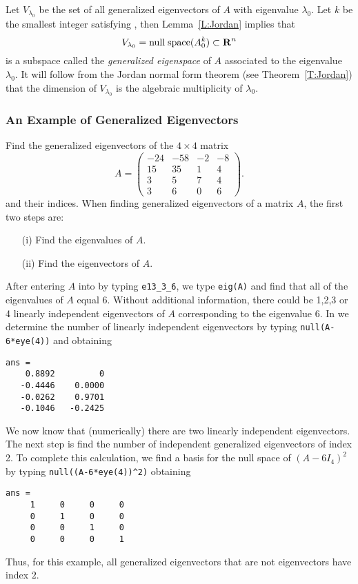 \documentclass{ximera}
\begin{document}
Let $V_{\lambda_0}$ be the set of all generalized eigenvectors of $A$ with 
eigenvalue $\lambda_0$.  Let $k$ be the smallest integer satisfying
, then Lemma~\ref{L:Jordan} implies that 
\[
V_{\lambda_0}={\rm null\;space}(A_0^k)\subset \mbox{$\bf{R}$}^n
\]
is a subspace called the {\em generalized eigenspace\/}
 of $A$ associated to the eigenvalue
$\lambda_0$.  It will follow from the Jordan normal form theorem (see
Theorem~\ref{T:Jordan}) that the dimension of $V_{\lambda_0}$ is the 
algebraic multiplicity of $\lambda_0$.


\subsubsection*{An Example of Generalized Eigenvectors}

Find the generalized eigenvectors of the $4\times 4$ matrix
\begin{equation*}
A=\left(\begin{array}{rrrr}
  -24 & -58 &  -2 &  -8\\
   15 &  35 &   1 &   4\\
    3 &   5 &   7 &   4\\
    3 &   6 &   0 &   6
\end{array}\right).
\end{equation*}
and their indices.  When finding generalized eigenvectors of a matrix $A$, 
the first two steps are:
\begin{enumerate}
\item[(i)]  Find the eigenvalues of $A$.
\item[(ii)]  Find the eigenvectors of $A$.
\end{enumerate}
After entering $A$ into \Matlab by typing {\tt e13\_3\_6}, we type 
{\tt eig(A)} and find that all of the eigenvalues of $A$ equal $6$.  Without 
additional information, there could be 1,2,3 or 4 linearly independent 
eigenvectors of $A$ corresponding to the eigenvalue $6$.  In \Matlab we 
determine the number of linearly independent eigenvectors by typing 
{\tt null(A-6*eye(4))} and obtaining
\begin{verbatim}
ans =
    0.8892         0
   -0.4446    0.0000
   -0.0262    0.9701
   -0.1046   -0.2425
\end{verbatim}
 
We now know that (numerically) there are two linearly independent
eigenvectors.  The next step is find the number of independent generalized 
eigenvectors of index 2.  To complete this calculation, we find 
a basis for the null space of $(A-6I_4)^2$ by typing 
{\tt null((A-6*eye(4))\^{ }2)} obtaining
\begin{verbatim}
ans =
     1     0     0     0
     0     1     0     0
     0     0     1     0
     0     0     0     1
\end{verbatim}
Thus, for this example, all generalized eigenvectors that are not
eigenvectors have index $2$.
\end{document}
